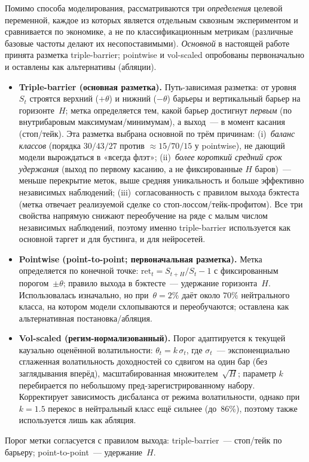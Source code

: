 \documentclass[12pt,a4paper]{report}
\begin{document}
Помимо способа моделирования, рассматриваются три \emph{определения} целевой
переменной, каждое из которых является отдельным сквозным экспериментом и
сравнивается по экономике, а не по классификационным метрикам (различные базовые
частоты делают их несопоставимыми). \emph{Основной} в настоящей работе принята
разметка triple-barrier; pointwise и vol-scaled опробованы первоначально и оставлены
как альтернативы (абляции).
\begin{itemize}[leftmargin=*]
  \item \textbf{Triple-barrier (основная разметка).} Путь-зависимая разметка: от
        уровня $S_t$ строятся верхний ($+\theta$) и нижний ($-\theta$) барьеры и
        вертикальный барьер на горизонте~$H$; метка определяется тем, какой барьер
        достигнут \emph{первым} (по внутрибаровым максимумам/минимумам), а выход~---
        в момент касания (стоп/тейк). Эта разметка выбрана основной по трём причинам:
        (i)~\emph{баланс классов} (порядка $30/43/27$ против $\approx 15/70/15$ у
        pointwise), не дающий модели вырождаться в «всегда флэт»; (ii)~\emph{более
        короткий средний срок удержания} (выход по первому касанию, а не фиксированные
        $H$ баров)~--- меньше перекрытие меток, выше средняя уникальность и больше
        эффективно независимых наблюдений; (iii)~согласованность с правилом выхода
        бэктеста (метка отвечает реализуемой сделке со стоп-лоссом/тейк-профитом). Все
        три свойства напрямую снижают переобучение на ряде с малым числом независимых
        наблюдений, поэтому именно triple-barrier используется как основной таргет и
        для бустинга, и для нейросетей.
  \item \textbf{Pointwise (point-to-point; первоначальная разметка).} Метка
        определяется по конечной точке: $\mathrm{ret}_t=S_{t+H}/S_t-1$ с
        фиксированным порогом~$\pm\theta$; правило выхода в бэктесте~--- удержание
        горизонта~$H$. Использовалась изначально, но при~$\theta=2\%$ даёт около
        $70\%$ нейтрального класса, на котором модели схлопываются и переобучаются;
        оставлена как альтернативная постановка/абляция.
  \item \textbf{Vol-scaled (регим-нормализованный).} Порог адаптируется к текущей
        каузально оценённой волатильности: $\theta_t=k\,\sigma_t$, где $\sigma_t$~---
        экспоненциально сглаженная волатильность доходностей со сдвигом на один бар
        (без заглядывания вперёд), масштабированная множителем~$\sqrt{H}$; параметр
        $k$ перебирается по небольшому пред-зарегистрированному набору. Корректирует
        зависимость дисбаланса от режима волатильности, однако при~$k=1.5$ перекос в
        нейтральный класс ещё сильнее (до~$86\%$), поэтому также используется лишь как
        абляция.
\end{itemize}
Порог метки согласуется с правилом выхода: triple-barrier~--- стоп/тейк по барьеру;
point-to-point~--- удержание~$H$.
\end{document}
